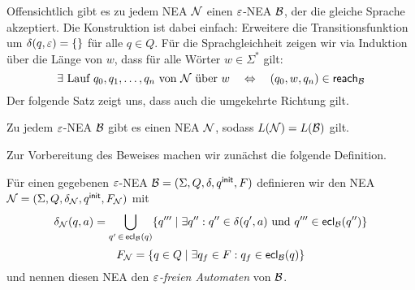 Offensichtlich gibt es zu jedem \ac{NEA} $\mathcal{N}$ einen $\varepsilon$-NEA $\mathcal{B}$, der die gleiche Sprache akzeptiert.
Die Konstruktion ist dabei einfach: Erweitere die Transitionsfunktion um $\delta(q,\varepsilon)=\{\}$ für alle $q\in Q$.
Für die Sprachgleichheit zeigen wir via Induktion über die Länge von $w$, dass für alle Wörter $w \in \Sigma^*$ gilt:
$$\exists \text{ Lauf } q_0,q_1,\ldots, q_n \text{ von $\mathcal{N}$ über } w \quad\Leftrightarrow\quad (q_0,w,q_n)\in\textsf{reach}_{\mathcal{B}}$$
Der folgende Satz zeigt uns, dass auch die umgekehrte Richtung gilt.

\begin{Satz}\label{satz:2.EpsElim}
    Zu jedem $\varepsilon$-NEA $\mathcal{B}$ gibt es einen \ac{NEA} $\mathcal{N}$, sodass $L(\mathcal{N})=L(\mathcal{B})$ gilt.
\end{Satz}
Zur Vorbereitung des Beweises machen wir zunächst die folgende Definition.

\begin{Def}
 Für einen gegebenen $\varepsilon$-NEA $\mathcal{B}= (\Sigma, Q,\delta,q^\mathsf{init},F)$ definieren wir den \acs*{NEA} $\mathcal{N}= (\Sigma, Q,\delta_{\mathcal{N}},q^\mathsf{init},F_{\mathcal{N}})$ mit
        $$\delta_{\mathcal{N}}(q,a)=\bigcup\limits_{q'\,\in\,\textsf{ecl}_{\mathcal{B}}(q)}\{q'''\mid \exists q'' : q''\in\delta(q',a) \text{ und } q'''\in\textsf{ecl}_{\mathcal{B}}(q'')\}$$
        $$F_{\mathcal{N}}=\{q\in Q\mid \exists q_f\in F: q_f\in\textsf{ecl}_{\mathcal{B}}(q)\}$$
und nennen diesen \ac{NEA} den \emph{$\varepsilon$-freien Automaten} von $\mathcal{B}$.
\end{Def}

\goodbreak

